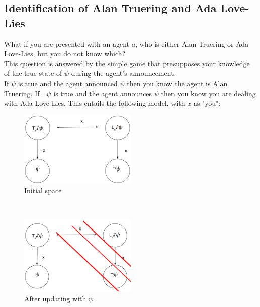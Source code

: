 \documentclass[12pt, titlepage, twoside, a4paper]{report}
\begin{document}
\subsection{Identification of Alan Truering and Ada Love-Lies}
What if you are presented with an agent $a$, who is either Alan Truering or Ada Love-Lies, but you do not know which?\\
This question is answered by the simple game that presupposes your knowledge of the true state of $\psi$ during the agent's announcement.\\
If $\psi$ is true and the agent announced $\psi$ then you know the agent is Alan Truering. If $\neg \psi$ is true and the agent announces $\psi$ then you know you are dealing with Ada Love-Lies.
This entails the following model, with $x$ as "you":
\begin{figure}[h!]
  \centering
  \includegraphics[width=0.5\textwidth]{slide10.eps}
  \caption{Initial space}
\end{figure}\\
\begin{figure}[h!]
  \centering
  \includegraphics[width=0.5\textwidth]{slide11.eps}
  \caption{After updating with $\psi$}
\end{figure}
\end{document}
